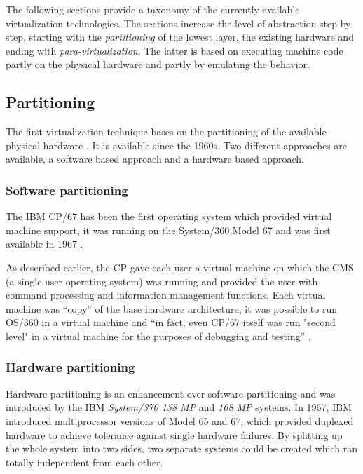 \bigskip

The  following sections  provide  a taxonomy  of  the currently  available
virtualization   technologies.   The  sections   increase  the   level  of
abstraction  step by step,  starting with  the \emph{partitioning}  of the
lowest   layer,    \ie   the    existing   hardware   and    ending   with
\emph{para-virtualization}. The latter is  based on executing machine code
partly on the physical hardware and partly by emulating the behavior.

\subsection{Partitioning}
\label{sec:vt-partitioning}

The  first  virtualization technique  bases  on  the  partitioning of  the
available physical  hardware \cite{borden89}.   It is available  since the
1960s. Two  different approaches are available, a  software based approach
and a hardware based approach.

\subsubsection{Software partitioning}
\label{sec:softw-part}

The IBM CP/67  has been the first operating  system which provided virtual
machine support, it  was running on the System/360 Model  67 and was first
available in 1967 \cite{borden89}.

As described earlier, the CP gave each user a virtual machine on which the
CMS (a  single user  operating system) was  running and provided  the user
with command processing and information management functions. Each virtual
machine was ``copy'' of the base hardware architecture, it was possible to
run OS/360 in  a virtual machine and ``in fact, even  CP/67 itself was run
"second  level" in a  virtual machine  for the  purposes of  debugging and
testing'' \cite{borden89}.

\subsubsection{Hardware partitioning}
\label{sec:hardw-part}

Hardware partitioning is an enhancement over software partitioning and was
introduced  by  the  IBM   \emph{System/370  158  MP}  and  \emph{168  MP}
systems. In 1967,  IBM introduced multiprocessor versions of  Model 65 and
67, which  provided duplexed hardware to achieve  tolerance against single
hardware failures.  By  splitting up the whole system  into two sides, two
separate systems could be created  which ran totally independent from each
other.

